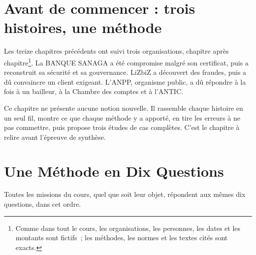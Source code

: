 \bigskip

\section*{Avant de commencer : trois histoires, une méthode}

Les treize chapitres précédents ont suivi trois organisations, chapitre
après chapitre\footnote{Comme dans tout le cours, les organisations, les
personnes, les dates et les montants sont fictifs~; les méthodes, les
normes et les textes cités sont exacts.}. La BANQUE SANAGA a été compromise
malgré son certificat, puis a reconstruit sa sécurité et sa gouvernance.
LiZbiZ a découvert des fraudes, puis a dû convaincre un client exigeant.
L'ANPP, organisme public, a dû répondre à la fois à un bailleur, à la
Chambre des comptes et à l'ANTIC.

\medskip

Ce chapitre ne présente aucune notion nouvelle. Il rassemble chaque
histoire en un seul fil, montre ce que chaque méthode y a apporté, en tire
les erreurs à ne pas commettre, puis propose trois études de cas complètes.
C'est le chapitre à relire avant l'épreuve de synthèse.

\separateur

\section{Une Méthode en Dix Questions}
\label{sec:c14-methode}

Toutes les missions du cours, quel que soit leur objet, répondent aux mêmes
dix questions, dans cet ordre.

